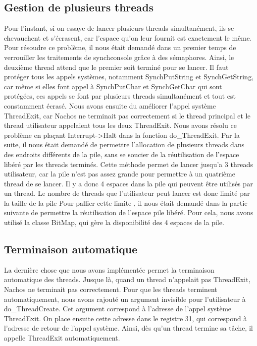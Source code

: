 \documentclass[11pt]{article}
\begin{document}
\subsection{Gestion de plusieurs threads}
Pour l'instant, si on essaye de lancer plusieurs threads simultanément, ils se chevauchent et s'écrasent, car l'espace qu'on leur fournit est exactement le même.
Pour résoudre ce problème, il nous était demandé dans un premier temps de verrouiller les traitements de synchconsole grâce à des sémaphores. Ainsi, le deuxième thread attend que le premier soit terminé pour se lancer. Il faut protéger tous les appels systèmes, notamment \textcolor{blue2}{SynchPutString} et \textcolor{blue2}{SynchGetString}, car même si elles font appel à \textcolor{blue2}{SynchPutChar} et \textcolor{blue2}{SynchGetChar} qui sont protégées, ces appels se font par plusieurs threads simultanément et tout est constamment écrasé.
\newline
Nous avons ensuite du améliorer l'appel système \textcolor{blue2}{ThreadExit}, car Nachos ne terminait pas correctement si le thread principal et le thread utilisateur appelaient tous les deux \textcolor{blue2}{ThreadExit}. Nous avons
résolu ce problème en plaçant \textcolor{red2}{Interrupt->Halt} dans la fonction \textcolor{red2}{do\_ThreadExit}.
\newline
Par la suite, il nous était demandé de permettre l'allocation de plusieurs threads dans des endroits différents de la pile, sans se soucier de la réutilisation de l'espace libéré par les threads terminés.
Cette méthode permet de lancer jusqu'a 3 threads utilisateur, car la pile n'est pas assez grande pour permettre à un quatrième thread de se lancer. Il y a donc 4 espaces dans la pile qui peuvent être utilisés par un thread.
Le nombre de threads que l'utilisateur peut lancer est donc limité
par la taille de la pile
\newline
Pour pallier cette limite , il nous était demandé dans la partie suivante de permettre la réutilisation de l'espace pile libéré.
Pour cela, nous avons utilisé la classe BitMap, qui gère la disponibilité des 4 espaces de la pile.


\subsection{Terminaison automatique}
La dernière chose que nous avons implémentée permet la terminaison automatique des threads. Jusque là, quand un thread n'appelait pas \textcolor{blue2}{ThreadExit}, Nachos ne terminait pas correctement.
Pour que les threads terminent automatiquement, nous avons rajouté un argument invisible pour l'utilisateur à \textcolor{red2}{do\_ThreadCreate}. Cet argument correspond à l'adresse de l'appel système \textcolor{blue2}{ThreadExit}.
On place ensuite cette adresse dans le registre 31, qui correspond à l'adresse de retour de l'appel système. Ainsi, dès qu'un thread termine sa tâche, il appelle \textcolor{blue2}{ThreadExit} automatiquement.
\end{document}
